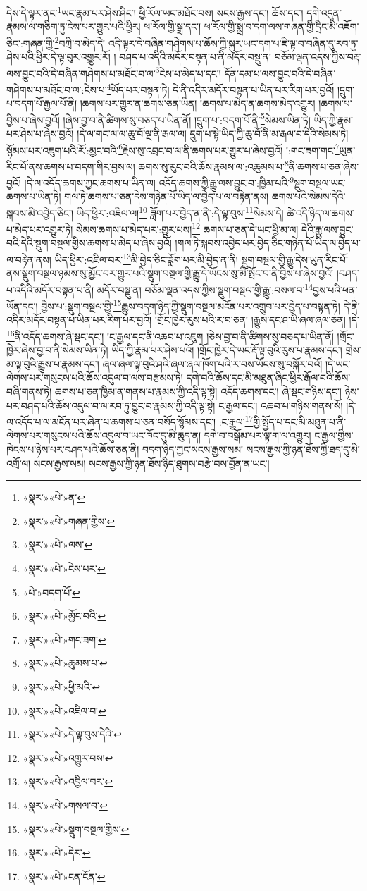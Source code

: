 དེས་དེ་ལྟར་ནང་\footnote{«སྣར་»«པེ་»ན་}ཡང་རྣམ་པར་ཤེས་ཤིང་། ཕྱི་རོལ་ཡང་མཐོང་བས། སངས་རྒྱས་དང་། ཆོས་དང་། དགེ་འདུན་རྣམས་ལ་གཅིག་ཏུ་ངེས་པར་གྱུར་པའི་ཕྱིར། ཕ་རོལ་གྱི་སྒྲ་དང་། ཕ་རོལ་གྱི་སྨྲ་བ་དག་ལས་གཞན་གྱི་དྲིང་མི་འཇོག་ཅིང་:གཞན་གྱི་\footnote{«སྣར་»«པེ་»གཞན་གྱིས་}བཀྲི་བ་མེད་དེ། འདི་ལྟར་དེ་བཞིན་གཤེགས་པ་ཆོས་ཀྱི་སྐུར་ཡང་དག་པ་ཇི་ལྟ་བ་བཞིན་དུ་རབ་ཏུ་ཤེས་པའི་ཕྱིར་དེ་ལྟ་བུར་འགྱུར་རོ། །
བཤད་པ་འདིའི་མདོར་བསྟན་པ་ནི་མདོར་བསྡུ་ན། བཅོམ་ལྡན་འདས་ཀྱིས་བརྡ་ལས་བྱུང་བའི་དེ་བཞིན་གཤེགས་པ་མཐོང་བ་ལ་\footnote{«སྣར་»«པེ་»ལས་}ངེས་པ་མེད་པ་དང་། དོན་དམ་པ་ལས་བྱུང་བའི་དེ་བཞིན་གཤེགས་པ་མཐོང་བ་ལ་:ངེས་པ་\footnote{«སྣར་»«པེ་»ངེས་པར་}ཡོད་པར་བསྟན་ཏེ། དེ་ནི་འདིར་མདོར་བསྟན་པ་ཡིན་པར་རིག་པར་བྱའོ། །དྲུག་པ་བདག་པོ་རྒྱལ་པོ་ནི། །ཆགས་པར་གྱུར་ན་ཆགས་ཅན་ཡིན། །ཆགས་པ་མེད་ན་ཆགས་མེད་འགྱུར། །ཆགས་པ་བྱིས་པ་ཞེས་བྱའོ། །ཞེས་བྱ་བ་ནི་ཚིགས་སུ་བཅད་པ་ཡིན་ནོ། །དྲུག་པ་:བདག་པོ་ནི་\footnote{«པེ་»བདག་པོ་}སེམས་ཡིན་ཏེ། ཡིད་ཀྱི་རྣམ་པར་ཤེས་པ་ཞེས་བྱའོ། །དེ་ལ་གང་ལ་ལ་ཆུ་བོ་ལྔ་ནི་རྒལ་ལ། དྲུག་པ་སྟེ་ཡིད་ཀྱི་ཆུ་བོ་ནི་མ་རྒལ་བ་དེའི་སེམས་ཏེ། སྙོམས་པར་འཇུག་པའི་རོ་:མྱང་བའི་\footnote{«སྣར་»«པེ་»མྱོང་བའི་}རྗེས་སུ་འབྲང་བ་ལ་ནི་ཆགས་པར་གྱུར་པ་ཞེས་བྱའོ། །:གང་ཟག་གང་\footnote{«སྣར་»«པེ་»གང་ཟག་}ཡུན་རིང་པོ་ནས་ཆགས་པ་བདག་གིར་བྱས་ལ། ཆགས་སུ་རུང་བའི་ཆོས་རྣམས་ལ་:འཆུམས་པ་\footnote{«སྣར་»«པེ་»ཆུམས་པ་}ནི་ཆགས་པ་ཅན་ཞེས་བྱའོ། །དེ་ལ་འདོད་ཆགས་ཀྱང་ཆགས་པ་ཡིན་ལ། འདོད་ཆགས་ཀྱི་རྒྱུ་ལས་བྱུང་བ་:ཁྱིམ་པའི་\footnote{«སྣར་»«པེ་»ཕྱི་མའི་}སྡུག་བསྔལ་ཡང་ཆགས་པ་ཡིན་ཏེ། གལ་ཏེ་ཆགས་པ་ཅན་དེས་གཉེན་པོ་ཡིད་ལ་བྱེད་པ་ལ་བརྟེན་ནས། ཆགས་པའི་སེམས་དེའི་སྐབས་མི་འབྱེད་ཅིང་། ཡིད་ཕྱིར་:འཇིལ་ལ།\footnote{«སྣར་»«པེ་»འཇིལ་བ།} ཟློག་པར་བྱེད་ན་ནི་:དེ་ལྟ་བུས་\footnote{«སྣར་»«པེ་»དེ་ལྟ་བུས་དེའི་}སེམས་དེ། ཚེ་འདི་ཉིད་ལ་ཆགས་པ་མེད་པར་འགྱུར་ཏེ། སེམས་ཆགས་པ་མེད་པར་:གྱུར་པས།\footnote{«སྣར་»«པེ་»འགྱུར་བས།} ཆགས་པ་ཅན་དེ་ཡང་ཕྱི་མ་ལ། དེའི་རྒྱུ་ལས་བྱུང་བའི་དེའི་སྡུག་བསྔལ་གྱིས་ཆགས་པ་མེད་པ་ཞེས་བྱའོ། །གལ་ཏེ་སྐབས་འབྱེད་པར་བྱེད་ཅིང་གཉེན་པོ་ཡིད་ལ་བྱེད་པ་ལ་བརྟེན་ནས། ཡིད་ཕྱིར་:འཇིལ་བར་\footnote{«སྣར་»«པེ་»འབྱིལ་བར་}མི་བྱེད་ཅིང་ཟློག་པར་མི་བྱེད་ན་ནི། སྡུག་བསྔལ་གྱི་རྒྱུ་དེས་ཡུན་རིང་པོ་ནས་སྡུག་བསྔལ་ཉམས་སུ་མྱོང་བར་གྱུར་པའི་སྡུག་བསྔལ་གྱི་རྒྱུ་དེ་ཡོངས་སུ་མི་སྤོང་བ་ནི་བྱིས་པ་ཞེས་བྱའོ། །བཤད་པ་འདིའི་མདོར་བསྟན་པ་ནི། མདོར་བསྡུ་ན། བཅོམ་ལྡན་འདས་ཀྱིས་སྡུག་བསྔལ་གྱི་རྒྱུ་:བསལ་བ་\footnote{«སྣར་»«པེ་»གསལ་བ་}བྱས་པའི་ཕན་ཡོན་དང་། བྱིས་པ་:སྡུག་བསྔལ་གྱི་\footnote{«སྣར་»«པེ་»སྡུག་བསྔལ་གྱིས་}རྒྱུས་བདག་ཉིད་ཀྱི་སྡུག་བསྔལ་མངོན་པར་འགྲུབ་པར་བྱེད་པ་བསྟན་ཏེ། དེ་ནི་འདིར་མདོར་བསྟན་པ་ཡིན་པར་རིག་པར་བྱའོ། །གྲོང་ཁྱེར་རུས་པའི་ར་བ་ཅན། །རྒྱུས་དང་ཤ་ཡི་ཞལ་ཞལ་ཅན། །དེ་\footnote{«སྣར་»«པེ་»དེར་}ནི་འདོད་ཆགས་ཞེ་སྡང་དང་། །ང་རྒྱལ་དང་ནི་འཆབ་པ་འཇུག །ཅེས་བྱ་བ་ནི་ཚིགས་སུ་བཅད་པ་ཡིན་ནོ། །གྲོང་ཁྱེར་ཞེས་བྱ་བ་ནི་སེམས་ཡིན་ཏེ། ཡིད་ཀྱི་རྣམ་པར་ཤེས་པའོ། །གྲོང་ཁྱེར་དེ་ཡང་རྡོ་ལྟ་བུའི་རུས་པ་རྣམས་དང་། གྲེས་མ་ལྟ་བུའི་རྒྱུས་པ་རྣམས་དང་། ཞལ་ཞལ་ལྟ་བུའི་ཤའི་ཞལ་ཞལ་ཁོག་པའི་ར་བས་ཡོངས་སུ་བསྐོར་བའོ། །དེ་ཡང་ལེགས་པར་གསུངས་པའི་ཆོས་འདུལ་བ་ལས་བརྩམས་ཏེ། དགེ་བའི་ཆོས་དང་མི་མཐུན་ཞིང་ཕྱིར་རྒོལ་བའི་ཆོས་བཞི་གནས་ཏེ། ཆགས་པ་ཅན་ཁྱིམ་ན་གནས་པ་རྣམས་ཀྱི་འདི་ལྟ་སྟེ། འདོད་ཆགས་དང་། ཞེ་སྡང་གཉིས་དང་། ཉེས་པར་བཤད་པའི་ཆོས་འདུལ་བ་ལ་རབ་ཏུ་བྱུང་བ་རྣམས་ཀྱི་འདི་ལྟ་སྟེ། ང་རྒྱལ་དང་། འཆབ་པ་གཉིས་གནས་སོ། །དེ་ལ་འདོད་པ་ལ་མངོན་པར་ཞེན་པ་ཆགས་པ་ཅན་བསོད་སྙོམས་དང་། :ང་རྒྱལ་\footnote{«སྣར་»«པེ་»ངན་ངོན་}གྱི་སྤྱོད་པ་དང་མི་མཐུན་པ་ནི་ལེགས་པར་གསུངས་པའི་ཆོས་འདུལ་བ་ཡང་ཁོང་དུ་མི་ཆུད་ན། དགེ་བ་བསྒོམ་པར་ལྟ་ག་ལ་འགྱུར། ང་རྒྱལ་གྱིས་ཁེངས་པ་ཉེས་པར་བཤད་པའི་ཆོས་ཅན་ནི། བདག་ཉིད་ཀྱང་སངས་རྒྱས་སམ། སངས་རྒྱས་ཀྱི་ཉན་ཐོས་ཀྱི་ཐད་དུ་མི་འགྲོ་ལ། སངས་རྒྱས་སམ། སངས་རྒྱས་ཀྱི་ཉན་ཐོས་ཉིད་ཐུགས་བརྩེ་བས་བྱོན་ན་ཡང་། 